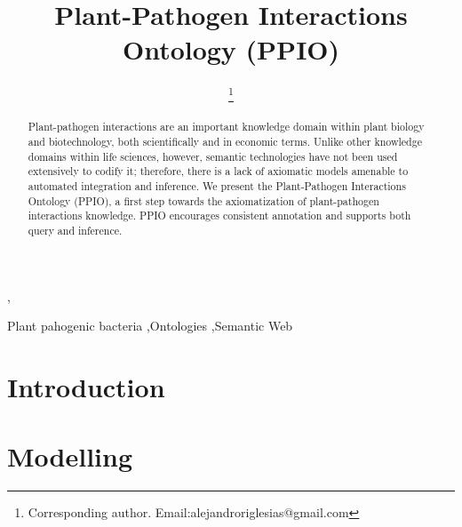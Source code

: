 \documentclass[sw]{iosart2c}
\begin{document}
\begin{frontmatter}

\title{Plant-Pathogen Interactions Ontology (PPIO)}
\runningtitle{}




\author[A]{ \thanks{Corresponding author. Email:alejandroriglesias@gmail.com}},
\author[A]{ }
\author[A]{ }
\author[A]{ }
\runningauthor{}
\address[A]{Biological Informatics Group, Centre for Plant Biotechnology and Genomics (CBGP), Technical University of Madrid (UPM), Spain}

\begin{abstract}
Plant-pathogen interactions are an important knowledge domain within plant biology and biotechnology, both scientifically and in economic terms. Unlike other knowledge domains within   life sciences, however, semantic technologies have not been used extensively to codify it; therefore, there is a lack of axiomatic models amenable to automated integration and inference. We present the Plant-Pathogen Interactions Ontology (PPIO), a first step towards the axiomatization of plant-pathogen interactions knowledge. PPIO encourages consistent annotation and supports both query and inference.
\end{abstract}

\begin{keyword}
 Plant pahogenic bacteria \sep Ontologies \sep Semantic Web 
\end{keyword}

\end{frontmatter}


\section{Introduction}\label{s1}




\section{Modelling}
\end{document}
